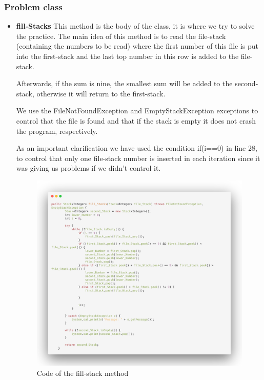 \documentclass[a4paper]{article}
\theoremstyle{plain}
\theoremstyle{definition}
\begin{document}
        \subsubsection{Problem class}
            \begin{itemize}
                \item \textbf{fill-Stacks}
                This method is the body of the class, it is where we try to solve the practice. The main idea of this method is to read the file-stack (containing the numbers to be read) where the first number of this file is put into the first-stack and the last top number in this row is added to the file-stack.\par

                Afterwards, if the sum is nine, the smallest sum will be added to the second-stack, otherwise it will return to the first-stack.\par

                We use the FileNotFoundException and EmptyStackException exceptions to control that the file is found and that if the stack is empty it does not crash the program, respectively.\par

                As an important clarification we have used the condition if(i==0) in line 28, to control that only one file-stack number is inserted in each iteration since it was giving us problems if we didn't control it.\par
                \begin{figure}[h]
                     \centering
                     \includegraphics[width=300pt\textwidth]{fill-stack.png}
                     \caption{Code of the fill-stack method}
                     \label{fig:mesh1}
                \end{figure}


\end{itemize}
\end{document}
